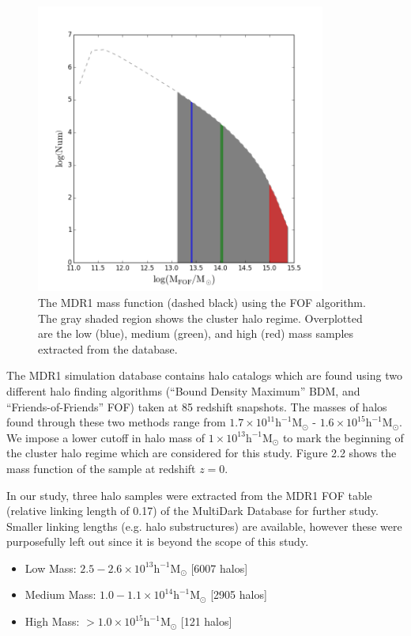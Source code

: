 \begin{figure}
\centering
\includegraphics[width=0.85\textwidth]{images/ClusterProjectionProject/multidarkhalomassfunctions.pdf}      
\caption[The MultiDark MDR1 Mass Function.]{The MDR1 mass function (dashed black) using the FOF algorithm. The gray
  shaded region shows the cluster halo regime. Overplotted are the low
  (blue), medium (green), and high (red) mass samples extracted from
  the database.}  
\label{fig:MDR1 Mass Function}
\end{figure}

The MDR1 simulation database \citep{Riebe2013} contains halo catalogs which are
found using two different halo finding algorithms (``Bound Density
Maximum'' BDM, and  ``Friends-of-Friends'' FOF) taken at 85 redshift
snapshots. The masses of halos found through these two methods range
from $1.7 \times 10^{11} \mathrm{h}^{-1} \mathrm{M}_{\odot}$ - $1.6 \times 10^{15}
\mathrm{h}^{-1} \mathrm{M}_{\odot}$. We impose a lower cutoff in halo mass of $1 \times 10^{13}
\mathrm{h}^{-1} \mathrm{M}_{\odot}$ to mark the beginning of the cluster halo regime which
are considered for this study. Figure 2.2 shows the mass function of the
sample at redshift $z=0$.   

In our study, three halo samples were extracted from the MDR1 FOF
table (relative linking length of 0.17) of the MultiDark Database for
further study. Smaller linking lengths (e.g. halo substructures) are
available, however these were purposefully left out since it is beyond
the scope of this study.
\begin{itemize}
\item Low Mass: $2.5 - 2.6 \times 10^{13} \mathrm{h}^{-1} \mathrm{M}_{\odot}$ [6007 halos]
\item Medium Mass: $1.0 - 1.1 \times 10^{14} \mathrm{h}^{-1} \mathrm{M}_{\odot}$ [2905 halos] 
\item High Mass: $> 1.0 \times 10^{15} \mathrm{h}^{-1} \mathrm{M}_{\odot}$ [121 halos]
\end{itemize}

